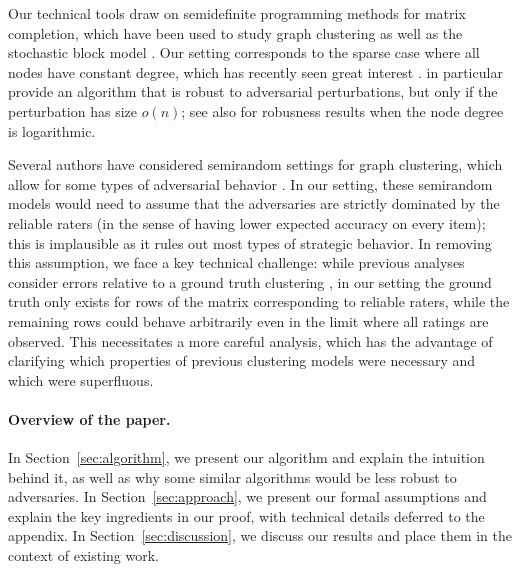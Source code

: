 Our technical tools draw on semidefinite programming methods for matrix 
completion, which have been used to study graph clustering as well 
as the stochastic block model \citep{holland1983stochastic,condon2001algorithms}. 
Our setting corresponds to the sparse case where all nodes have constant degree, 
which has recently seen great interest \citep{decelle2011asymptotic,
mossel2012stochastic,mossel2013proof,mossel2013belief,
massoulie2014community,guedon2014community,mossel2015consistency,
chin2015stochastic,abbe2015community,makarychev2015learning}. 
\citet{makarychev2015learning} in particular provide an algorithm that is 
robust to adversarial perturbations, but only if the perturbation has 
size $o(n)$; see also \citet{cai2015robust} for robusness results when 
the node degree is logarithmic.

Several authors have considered semirandom settings for graph clustering, which 
allow for some types of adversarial behavior \citep{feige2000finding,
feige2001heuristics,coja2004coloring,krivelevich2006semirandom,
coja2007solving,makarychev2012approximation,chen2014improved,guedon2014community,
moitra2015robust,agarwal2015multisection}. 
In our setting, these semirandom models would need to assume that the adversaries 
are strictly dominated by the reliable raters (in the sense of having lower 
expected accuracy on every item); this is implausible as it rules out 
most types of strategic behavior.
In removing this assumption, we face a key technical challenge: while previous 
analyses consider errors relative to a ground truth clustering 
\citep[e.g.][]{chen2014improved}, in our setting 
the ground truth only exists for rows of the matrix corresponding to reliable 
raters, while the remaining rows could behave arbitrarily even in the limit 
where all ratings are observed. This necessitates a more careful analysis, 
which has the advantage of clarifying which properties of previous clustering 
models were necessary and which were superfluous.


\paragraph{Overview of the paper.} In Section~\ref{sec:algorithm}, we 
present our algorithm and explain the intuition behind it, as well as why 
some similar algorithms would be less robust to adversaries. In 
Section~\ref{sec:approach}, we present our formal assumptions and explain 
the key ingredients in our proof, with technical details deferred to the 
appendix. In Section~\ref{sec:discussion}, we discuss our results and 
place them in the context of existing work.
